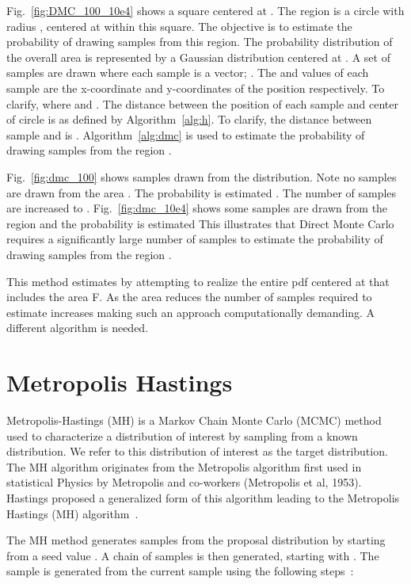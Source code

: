 \documentclass[journal]{IEEEtran}
\begin{document}
Fig.~\ref{fig:DMC_100_10e4} shows a  square centered at . The region  is a circle with radius , centered at  within this square. The objective is to estimate the probability of drawing samples from this region. The probability distribution of the overall area is represented by a Gaussian distribution centered at . A set of  samples  are drawn where each sample is a vector; . The  and  values of each sample are the x-coordinate and y-coordinates of the position respectively. To clarify,  where  and . The distance between the position of each sample and center of circle  is  as defined by Algorithm~\ref{alg:h}. To clarify, the distance between sample  and  is . Algorithm~\ref{alg:dmc} is used to estimate the probability of drawing samples from the region .

Fig.~\ref{fig:dmc_100} shows  samples drawn from the distribution. Note no samples are drawn from the area . The probability is estimated . The number of samples are increased to . Fig.~\ref{fig:dmc_10e4} shows some samples are drawn from the region  and the probability is estimated  This illustrates that Direct Monte Carlo requires a significantly large number of samples to estimate the probability of drawing samples from the region .



This method estimates  by attempting to realize the entire pdf centered at  that includes the area F. As the area  reduces the number of samples required to estimate  increases making such an approach computationally demanding. A different algorithm is needed. 
\section{Metropolis Hastings}
\label{sec:mh}

Metropolis-Hastings (MH) is a Markov Chain Monte Carlo (MCMC) method used to characterize a distribution of interest by sampling from a known distribution. We refer to this distribution of interest as the target distribution. The MH algorithm originates from the Metropolis algorithm first used in statistical Physics by Metropolis and co-workers (Metropolis et al, 1953)\cite{metropolis1953equation}. Hastings proposed a generalized form of this algorithm leading to the Metropolis Hastings (MH) algorithm~\cite{hastings1970monte}.

The MH method generates samples from the proposal distribution  by starting from a seed value . A chain of  samples is then generated, starting with . The sample  is generated from the current sample  using the following steps~\cite{IVAN}:
\end{document}
